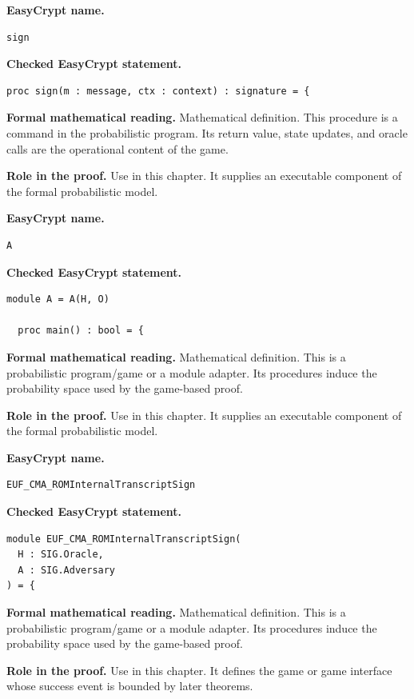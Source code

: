 \begin{formaldefinition}
\noindent\textbf{EasyCrypt name.}
\begin{lstlisting}[language=EasyCrypt,basicstyle=\ttfamily\scriptsize]
sign
\end{lstlisting}
\noindent\textbf{Checked EasyCrypt statement.}
\begin{lstlisting}[language=EasyCrypt,basicstyle=\ttfamily\scriptsize]
proc sign(m : message, ctx : context) : signature = {
\end{lstlisting}
\noindent\textbf{Formal mathematical reading.}
Mathematical definition. This procedure is a command in the probabilistic program.  Its return value, state updates, and oracle calls are the operational content of the game.

\noindent\textbf{Role in the proof.}
Use in this chapter. It supplies an executable component of the formal probabilistic model.

\end{formaldefinition}

\begin{formaldefinition}
\noindent\textbf{EasyCrypt name.}
\begin{lstlisting}[language=EasyCrypt,basicstyle=\ttfamily\scriptsize]
A
\end{lstlisting}
\noindent\textbf{Checked EasyCrypt statement.}
\begin{lstlisting}[language=EasyCrypt,basicstyle=\ttfamily\scriptsize]
module A = A(H, O)

  proc main() : bool = {
\end{lstlisting}
\noindent\textbf{Formal mathematical reading.}
Mathematical definition. This is a probabilistic program/game or a module adapter.  Its procedures induce the probability space used by the game-based proof.

\noindent\textbf{Role in the proof.}
Use in this chapter. It supplies an executable component of the formal probabilistic model.

\end{formaldefinition}

\begin{formaldefinition}
\noindent\textbf{EasyCrypt name.}
\begin{lstlisting}[language=EasyCrypt,basicstyle=\ttfamily\scriptsize]
EUF_CMA_ROMInternalTranscriptSign
\end{lstlisting}
\noindent\textbf{Checked EasyCrypt statement.}
\begin{lstlisting}[language=EasyCrypt,basicstyle=\ttfamily\scriptsize]
module EUF_CMA_ROMInternalTranscriptSign(
  H : SIG.Oracle,
  A : SIG.Adversary
) = {
\end{lstlisting}
\noindent\textbf{Formal mathematical reading.}
Mathematical definition. This is a probabilistic program/game or a module adapter.  Its procedures induce the probability space used by the game-based proof.

\noindent\textbf{Role in the proof.}
Use in this chapter. It defines the game or game interface whose success event is bounded by later theorems.

\end{formaldefinition}

